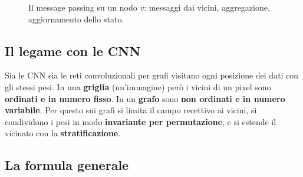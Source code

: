 \begin{figure}[ht]
\centering
{}
\caption{Il message passing su un nodo $v$: messaggi dai vicini, aggregazione, aggiornamento dello stato.}
\label{fig:message-passing}
\end{figure}

\subsection{Il legame con le CNN}

Sia le CNN sia le reti convoluzionali per grafi visitano ogni posizione dei dati con gli stessi pesi. In una
\textbf{griglia} (un'immagine) però i vicini di un pixel sono \textbf{ordinati e in numero fisso}. In un
\textbf{grafo} sono \textbf{non ordinati e in numero variabile}. Per questo sui grafi si limita il campo recettivo ai
vicini, si condividono i pesi in modo \textbf{invariante per permutazione}, e si estende il vicinato con la
\textbf{stratificazione}.

\subsection{La formula generale}

